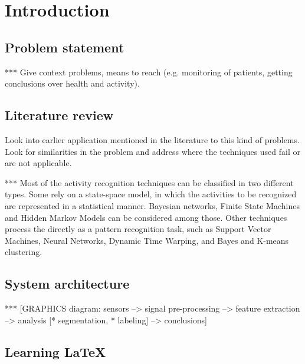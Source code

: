
\chapter{Introduction} %

\label{Chapter1} %



\section{Problem statement}
*** Give context problems, means to reach (e.g. monitoring of patients, 
getting conclusions over health and activity).

\section{Literature review}
Look into earlier application mentioned in the literature to this kind of 
problems. Look for similarities in the problem and address where the 
techniques used fail or are not applicable.

*** Most of the activity recognition techniques can be classified in two 
different types. Some rely on a state-space model, in which the activities to 
be recognized are represented in a statistical manner. Bayesian networks, 
Finite State Machines and Hidden Markov Models can be considered among those. 
Other techniques process the directly as a pattern recognition task, such as 
Support Vector Machines, Neural Networks, Dynamic Time Warping, and Bayes and 
K-means clustering.


\section{System architecture}

*** [GRAPHICS diagram: sensors --> signal pre-processing --> feature 
extraction --> analysis [* segmentation, * labeling] --> conclusions]




\section{Learning \LaTeX{}}

